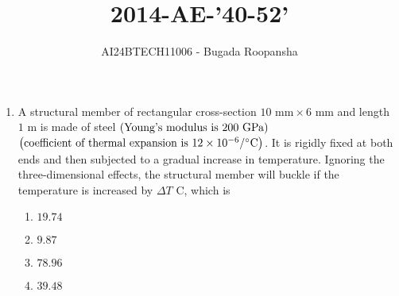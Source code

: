 \documentclass[journal,12pt,twocolumn]{IEEEtran}
\theoremstyle{remark}
\begin{document}

\vspace{3cm}
\title{2014-AE-'40-52'}
\author{AI24BTECH11006 - Bugada Roopansha}
\maketitle

\begin{enumerate}[start=40]
 
    \item A structural member of rectangular cross-section $10 \text{ mm} \times 6 \text{ mm}$ and length $1 \text{ m}$ is made of steel $\left(\text{Young's modulus is } 200 \text{ GPa}\right)$ $\left(\text{coefficient of thermal expansion is } 12 \times 10^{-6}/^{\circ}\text{C}\right)$. It is rigidly fixed at both ends and then subjected to a gradual increase in temperature. Ignoring the three-dimensional effects, the structural member will buckle if the temperature is increased by $\Delta T$ \degree C, which is





	    \begin{enumerate}
        \item $19.74$
        \item $9.87$
        \item $78.96$
        \item $39.48$
    \end{enumerate}



\end{enumerate}
\end{document}
